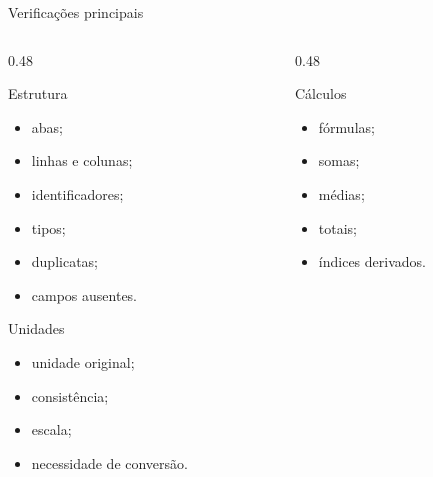 \begin{frame}{Verificações principais}

    \begin{columns}[T]

        \begin{column}{0.48\textwidth}

            \begin{block}{Estrutura}
                \begin{itemize}
                    \item abas;
                    \item linhas e colunas;
                    \item identificadores;
                    \item tipos;
                    \item duplicatas;
                    \item campos ausentes.
                \end{itemize}
            \end{block}

            \begin{block}{Unidades}
                \begin{itemize}
                    \item unidade original;
                    \item consistência;
                    \item escala;
                    \item necessidade de conversão.
                \end{itemize}
            \end{block}

        \end{column}


        \begin{column}{0.48\textwidth}

            \begin{block}{Cálculos}
                \begin{itemize}
                    \item fórmulas;
                    \item somas;
                    \item médias;
                    \item totais;
                    \item índices derivados.
                \end{itemize}
            \end{block}


\end{column}
\end{columns}
\end{frame}
